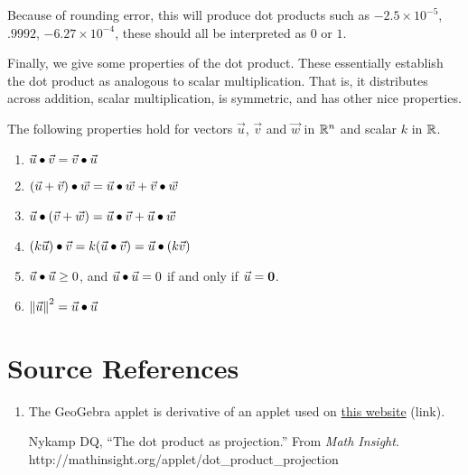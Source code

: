 \documentclass{ximera}
\begin{document}
\begin{exploration}
\begin{hint}
   Because of rounding error, this will produce dot products such as $-2.5\times 10^{-5}$, $.9992$, $-6.27\times10^{-4}$, these should all be interpreted as $0$ or $1$.

\end{hint}

\end{exploration}

Finally, we give some properties of the dot product. These essentially establish the dot product as analogous to scalar multiplication. That is, it distributes across addition, scalar multiplication, is symmetric, and has other nice properties.

\begin{theorem}\label{th:dotproductproperties} The following properties hold for
   vectors $\vec{u}$, $\vec{v}$ and $\vec{w}$ in $\mathbb{R}^n$ and scalar
   $k$ in $\mathbb{R}$.
   \begin{enumerate}
   \item\label{item:commutative}
     $\vec{u}\bullet\vec{v}=\vec{v}\bullet\vec{u}$
      
   \item\label{item:distributive} $(\vec{u}+\vec{v})\bullet \vec{w}=\vec{u}\bullet \vec{w}+\vec{v}\bullet \vec{w}$
      
   \item\label{item:distributive-again} $\vec{u}\bullet (\vec{v}+\vec{w})=\vec{u}\bullet\vec{v}+\vec{u}\bullet \vec{w}$
      
   \item\label{item:scalar} $(k\vec{u})\bullet \vec{v}=k(\vec{u}\bullet\vec{v})=\vec{u}\bullet (k\vec{v})$
      
   \item \label{item:positive} $\vec{u}\bullet\vec{u}\geq 0$, and $\vec{u}\bullet\vec{u}=0$ if and only if $\vec{u}={\bf 0}$.
      
   \item \label{item:norm}
     $\left\|\vec{u}\right\|^2=\vec{u}\bullet\vec{u}$
   \end{enumerate}
 \end{theorem}

\section*{Source References}

\begin{enumerate}
   \item The GeoGebra applet is derivative of an applet used on \href{http://mathinsight.org/applet/dot_product_projection}{this website} (link). 
   
   Nykamp DQ, “The dot product as projection.” From \emph{Math Insight}. http://mathinsight.org/applet/dot\_product\_projection
\end{enumerate}
\end{document}
